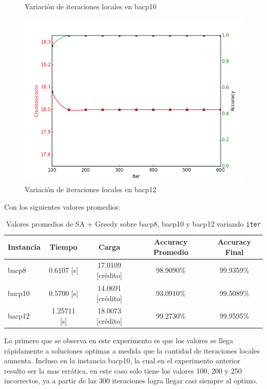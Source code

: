 \documentclass[letterpaper,10pt]{article}
\begin{document}
\begin{figure}[H]
        \caption{Variación de iteraciones locales en bacp10}
        \label{fig:iter2}
    \endminipage\hfill
    \includegraphics[width=\linewidth]{img/2-iter-bacp12.png}
        \caption{Variación de iteraciones locales en bacp12}
        \label{fig:iter3}
    \endminipage
\end{figure}

Con los siguientes valores promedios:

\begin{table}[H]
  \centering
  \begin{tabular}{@{}lcccc@{}}
    \toprule[1pt]
    Instancia & Tiempo & Carga & Accuracy Promedio & Accuracy Final \\
    \midrule
     bacp8 &  0.6107 [s] & 17.0109 [crédito] &  98.9090\% & 99.9359\% \\
    bacp10 &  0.5700 [s] & 14.0691 [crédito] &  93.0910\% & 99.5089\% \\
    bacp12 & 1.25711 [s] & 18.0073 [crédito] &  99.2730\% & 99.9595\% \\
    \bottomrule
  \end{tabular}
  \caption{Valores promedios de SA + Greedy sobre bacp8, bacp10 y bacp12 variando \texttt{iter}}
\end{table}

Lo primero que se observa en este experimento es que los valores se llega rápidamente a soluciones optimas a medida que la cantidad de iteraciones locales aumenta. Incluso en la instancia bacp10, la cual en el experimento anterior resulto ser la mas errática, en este caso solo tiene los valores 100, 200 y 250 incorrectos, ya a partir de las 300 iteraciones logra llegar casi siempre al optimo.
\end{document}
